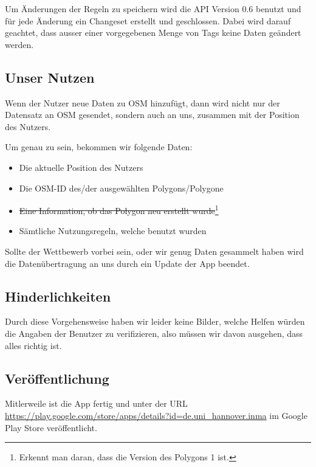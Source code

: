 Um Änderungen der Regeln zu speichern wird die API Version 0.6 benutzt und für jede Änderung ein Changeset erstellt und geschlossen.
Dabei wird darauf geachtet, dass ausser einer vorgegebenen Menge von Tags keine Daten geändert werden.

\subsection{Unser Nutzen}
Wenn der Nutzer neue Daten zu OSM hinzufügt, dann wird nicht nur der Datensatz an OSM gesendet, sondern auch an uns, zusammen mit der Position des Nutzers.

Um genau zu sein, bekommen wir folgende Daten:
\begin{itemize}
\item Die aktuelle Position des Nutzers
\item Die OSM-ID des/der ausgewählten Polygons/Polygone
\item \sout{Eine Information, ob das Polygon neu erstellt wurde}\footnote{Erkennt man daran, dass die Version des Polygons 1 ist.}
\item Sämtliche Nutzungsregeln, welche benutzt wurden
\end{itemize}
Sollte der Wettbewerb vorbei sein, oder wir genug Daten gesammelt haben wird die
Datenübertragung an uns durch ein Update der App beendet.

\subsection{Hinderlichkeiten}
Durch diese Vorgehensweise haben wir leider keine Bilder, welche Helfen würden die Angaben der Benutzer zu verifizieren,
also müssen wir davon ausgehen, dass alles richtig ist.

\subsection{Veröffentlichung}
Mitlerweile ist die App fertig und unter der URL \url{https://play.google.com/store/apps/details?id=de.uni_hannover.inma} im Google Play Store veröffentlicht.
